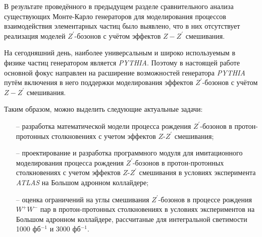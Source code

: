 В результате проведённого в предыдущем разделе сравнительного анализа существующих Монте-Карло генераторов для моделирования процессов взаимодействия элементарных частиц было выявлено, что в них отсутствует реализация моделей ${Z}^{\prime}$-бозонов с учётом эффектов $Z-{Z}^{\prime}$ смешивания. 

На сегодняшний день, наиболее универсальным и широко используемым в физике частиц генератором является \textit{PYTHIA}. Поэтому в настоящей работе основной фокус направлен на расширение возможностей генератора \textit{PYTHIA} путём включения в него поддержки моделирования эффектов ${Z}^{\prime}$-бозонов с учётом $Z-{Z}^{\prime}$ смешивания.

Таким образом, можно выделить следующие актуальные задачи:
\begin{enumerate}
	\item[--] разработка математической модели процесса рождения ${Z}^{\prime}$-бозонов в протон-протонных столкновениях с учетом эффектов $Z$-${Z}^{\prime}$ смешивания;
	
	\item[--] проектирование и разработка программного модуля для имитационного моделирования процесса
	рождения ${Z}^{\prime}$-бозонов в протон-протонных столкновениях с учетом эффектов $Z$-${Z}^{\prime}$ смешивания в условиях эксперимента \textit{ATLAS} на Большом адронном коллайдере;
	
	\item[--] оценка ограничений на углы смешивания ${Z}^{\prime}$-бозонов в процессе рождения ${W}^{+}$${W}^{-}$ пар в протон-протонных столкновениях
	в условиях экспериментов на Большом адронном коллайдере, рассчитаные для интегральной светимости 1000 фб${}^{−1}$ и 3000 фб${}^{−1}$.
	
\end{enumerate}